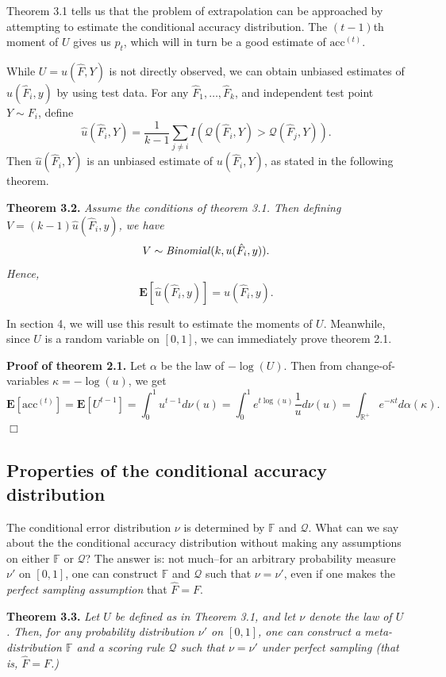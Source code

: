 \documentclass{article}
\newcommand{\E}{\textbf{E}}
\begin{document}
Theorem 3.1 tells us that the problem of extrapolation can be
approached by attempting to estimate the conditional accuracy
distribution.  The $(t-1)$th moment of $U$ gives us $p_t$, which will
in turn be a good estimate of $\text{acc}^{(t)}$.

While $U = u(\hat{F}, Y)$ is not directly observed, we can obtain unbiased estimates of $u(\hat{F}_i, y)$
by using test data.  For any $\hat{F}_1,\hdots, \hat{F}_k$, and independent test point $Y \sim F_i$, define
\begin{equation}\label{eq:hatu}
\hat{u}(\hat{F}_i, Y) = \frac{1}{k -1}\sum_{j \neq i} I(\mathcal{Q}(\hat{F}_i, Y) > \mathcal{Q}(\hat{F}_j, Y)).
\end{equation}
Then $\hat{u}(\hat{F}_i, Y)$ is an unbiased estimate of $u(\hat{F}_i, Y)$, as stated in the following theorem.

\noindent\textbf{Theorem 3.2.}\emph{
Assume the conditions of theorem 3.1.
Then defining $V = (k-1)\hat{u}(\hat{F}_i, y)$, we have
\[V \sim \text{\emph{Binomial}}(k, u(\hat{F}_i, y)).\]
Hence,
\[\E[\hat{u}(\hat{F}_i, y)] = u(\hat{F}_i, y).\]
}

In section 4, we will use this result to estimate the moments of $U$.
Meanwhile, since $U$ is a random variable on $[0, 1]$, we can immediately prove theorem 2.1.

\noindent\textbf{Proof of theorem 2.1.}  
Let $\alpha$ be the law of $-\log(U)$.
Then from change-of-variables $\kappa =-\log(u)$, we get
\[\E[\text{acc}^{(t)}] = \E[U^{t-1}] = 
\int_0^1 u^{t-1} d\nu(u) = \int_0^1 e^{t\log(u)} \frac{1}{u}d\nu(u) = 
\int_{\mathbb{R}^{+}} e^{-\kappa t} d\alpha(\kappa).\]
$\Box$




\subsection{Properties of the conditional accuracy distribution}

The conditional error distribution $\nu$ is determined by $\mathbb{F}$
and $\mathcal{Q}$.  What can we say about the the conditional accuracy
distribution without making any assumptions on either $\mathbb{F}$ or
$\mathcal{Q}$?  The answer is: not much--for an arbitrary probability
measure $\nu'$ on $[0,1]$, one can construct $\mathbb{F}$ and
$\mathcal{Q}$ such that $\nu = \nu'$, even if one makes the \emph{perfect sampling assumption} that $\hat{F}=F.$

\noindent\textbf{Theorem 3.3.} \emph{ Let $U$ be defined as in Theorem
  3.1, and let $\nu$ denote the law of $U$.  Then, for any probability
  distribution $\nu'$ on $[0,1]$, one can construct a
  meta-distribution $\mathbb{F}$ and a scoring rule $\mathcal{Q}$ such
  that $\nu = \nu'$ under perfect sampling (that is, $\hat{F} = F$.)  }
\end{document}
